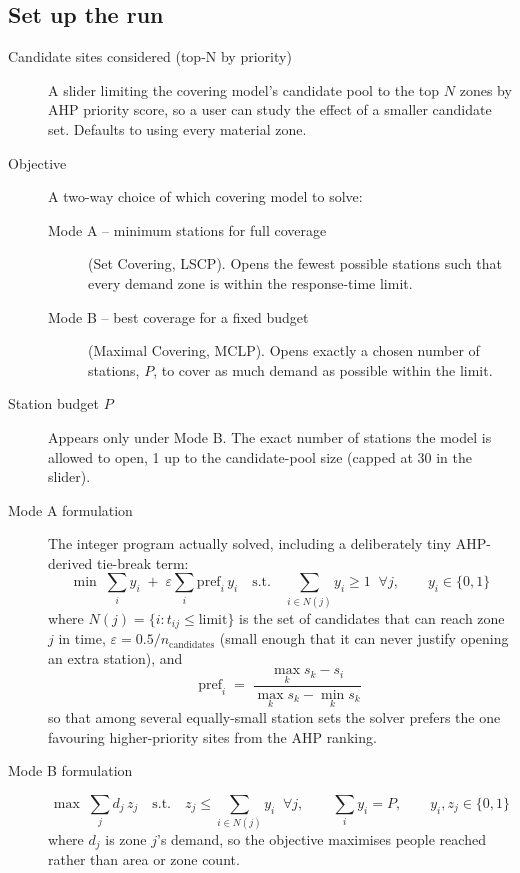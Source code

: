 \documentclass[11pt]{article}
\begin{document}
\subsection{Set up the run}
\begin{description}
  \item[Candidate sites considered (top-N by priority)] A slider limiting the
    covering model's candidate pool to the top $N$ zones by AHP priority
    score, so a user can study the effect of a smaller candidate set. Defaults
    to using every material zone.
  \item[Objective] A two-way choice of which covering model to solve:
    \begin{description}
      \item[Mode A -- minimum stations for full coverage] (Set Covering,
        LSCP). Opens the fewest possible stations such that every demand zone
        is within the response-time limit.
      \item[Mode B -- best coverage for a fixed budget] (Maximal Covering,
        MCLP). Opens exactly a chosen number of stations, $P$, to cover as
        much demand as possible within the limit.
    \end{description}
  \item[Station budget $P$] Appears only under Mode B. The exact number of
    stations the model is allowed to open, 1 up to the candidate-pool size
    (capped at 30 in the slider).
  \item[Mode A formulation] The integer program actually solved, including a
    deliberately tiny AHP-derived tie-break term:
    \[
      \min \; \sum_i y_i \;+\; \varepsilon\sum_i \text{pref}_i\, y_i
      \quad\text{s.t.}\quad
      \sum_{i \in N(j)} y_i \ge 1 \;\; \forall j, \qquad y_i \in \{0,1\}
    \]
    where $N(j) = \{i : t_{ij} \le \text{limit}\}$ is the set of candidates
    that can reach zone $j$ in time, $\varepsilon = 0.5 / n_{\text{candidates}}$
    (small enough that it can never justify opening an extra station), and
    \[
      \text{pref}_i \;=\; \frac{\max_k s_k - s_i}{\max_k s_k - \min_k s_k}
    \]
    so that among several equally-small station sets the solver prefers the
    one favouring higher-priority sites from the AHP ranking.
  \item[Mode B formulation]
    \[
      \max \; \sum_j d_j\, z_j
      \quad\text{s.t.}\quad
      z_j \le \sum_{i \in N(j)} y_i \;\;\forall j, \qquad
      \sum_i y_i = P, \qquad y_i, z_j \in \{0,1\}
    \]
    where $d_j$ is zone $j$'s demand, so the objective maximises people
    reached rather than area or zone count.
\end{description}
\end{document}
